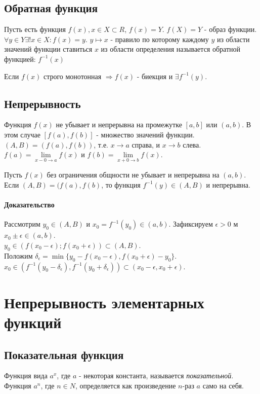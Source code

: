 \documentclass[10pt]{article}
\newcommand{\limxr}[1]{\lim\limits_{x-0 \to #1}}
\newcommand{\limxl}[1]{\lim\limits_{x+0 \to #1}}
\begin{document}
		\subsection{Обратная функция}
		Пусть есть функция $f(x), x \in X \subset R$, $f(x) = Y$. $f(X) = Y$ - образ функции.\\
		$\forall y \in Y \exists! x \in X : f(x) = y$. $y \mapsto x$ - правило по которому каждому $y$ из области значений функции ставиться $x$ из области определения называется обратной функцией: $f^{-1}(x)$
		
		Если $f(x)$ строго монотонная $\Rightarrow f(x)$ - биекция и $\exists f^{-1}(y)$. 
		
		\subsection{Непрерывность}
		Функция $f(x)$ не убывает и непрерывна на промежутке $[a,b]$ или $(a, b)$. В этом случае $[f(a), f(b)]$ - множество значений функции. $(A, B) = (f(a), f(b))$, т.е. $x \to a$ справа, и $x \to b$ слева. $f(a) = \limxr{a} f(x)$ и $f(b) = \limxl{b} f(x)$.
		
		Пусть $f(x)$ без ограничения общности не убывает и непрерывна на $(a, b)$. Если $(A, B) = (f(a), f(b)$, то функция $f^{-1}(y) \in (A, B)$ и непрерывна.
		
		\paragraph{Доказательство}
		Рассмотрим $y_0 \in (A, B)$ и $x_0 = f^{-1}(y_0) \in (a, b)$. Зафиксируем $\epsilon > 0$ м $x_0 \pm \epsilon \in (a, b)$.\\
		$y_0 \in (f(x_0 - \epsilon); f(x_0 + \epsilon)) \subset (A, B)$.\\
		Положим $\delta_\epsilon = \min \{y_0 - f(x_0 - \epsilon), f(x_0 + \epsilon) - y_0\}$.\\
		$x_0 \in (f^{-1}(y_0 - \delta_\epsilon), f^{-1}(y_0 + \delta_\epsilon)) \subset (x_0 - \epsilon, x_0 + \epsilon)$.
	
	\section{Непрерывность элементарных функций}
		\subsection{Показательная функция}
		Функция вида $a^x$, где $a$ - некоторая константа, называется \textit{показательной}.
		Функция $a^n$, где $n \in N$, определяется как произведение $n$-раз $a$ само на себя.
		
\end{document}
